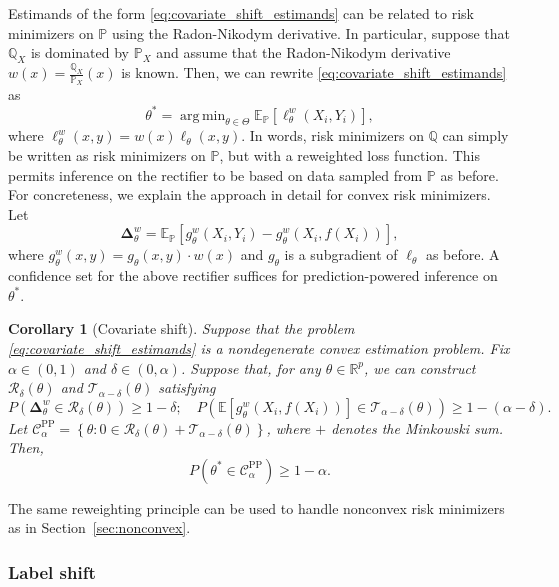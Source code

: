 \documentclass[10pt]{article}
\newtheorem{cor}{Corollary} %
\def\R{\mathbb{R}}
\def\E{\mathbb{E}}
\newcommand{\T}{\mathcal{T}}
\newcommand{\cR}{\mathcal{R}}
\renewcommand{\P}{\mathbb{P}}
\newcommand{\Q}{\mathbb{Q}}
\newcommand{\recw}{\mathbf{\Delta}^{w}}
\newcommand{\CPP}{\mathcal{C}^{\mathrm{PP}}}
\DeclareMathOperator*{\argmin}{arg\,min}
\begin{document}
Estimands of the form \eqref{eq:covariate_shift_estimands} can be related to risk minimizers on $\P$ using the Radon-Nikodym derivative. In particular, suppose that $\Q_X$ is dominated by $\P_X$ and assume that the Radon-Nikodym derivative $w(x) = \frac{\Q_X}{\P_X}(x)$ is known. Then, we can rewrite \eqref{eq:covariate_shift_estimands} as 
$$\theta^* = \argmin_{\theta\in \Theta} \E_{\P} [\ell_\theta^w(X_i,Y_i)],$$
where $\ell_\theta^w(x,y) = w(x) \ell_\theta(x,y)$. In words, risk minimizers on $\Q$ can simply be written as risk minimizers on $\P$, but with a reweighted loss function. This permits inference on the rectifier to be based on  data sampled from $\P$ as before. For concreteness, we explain the approach in detail for convex risk minimizers. Let
\begin{equation}
\label{eq:rec-covariate-shift}
\recw_{\theta} = \E_\P \left[g_\theta^w(X_i,Y_i) - g_\theta^w (X_i,f(X_i))\right],
\end{equation}
where $g_\theta^w (x,y) = g_\theta(x,y)\cdot w(x)$ and $g_\theta$ is a subgradient of $\ell_\theta$ as before. A confidence set for the above rectifier suffices for prediction-powered inference on $\theta^*$.



\begin{cor}[Covariate shift]
\label{cor:covariate-shift}
Suppose that the problem \eqref{eq:covariate_shift_estimands} is a nondegenerate convex estimation problem. Fix $\alpha\in(0,1)$ and $\delta\in(0,\alpha)$.
Suppose that, for any $\theta\in\R^p$, we can construct $\cR_\delta(\theta)$ and $\T_{\alpha-\delta}(\theta)$ satisfying
$$P\left(\recw_{\theta} \in \cR_{\delta}(\theta) \right) \geq 1-\delta; \quad P\left(\E [g^w_\theta(X_i,f(X_i))] \in \T_{\alpha-\delta}(\theta) \right) \geq 1-(\alpha-\delta).$$
Let $\CPP_\alpha = \left\{\theta : 0 \in \cR_\delta(\theta) + \T_{\alpha-\delta}(\theta)\right\}$, where $+$ denotes the Minkowski sum. Then,
\begin{equation}
    P( \theta^* \in \CPP_\alpha ) \geq 1-\alpha.
\end{equation}
\end{cor}

\noindent The same reweighting principle can be used to handle nonconvex risk minimizers as in Section~\ref{sec:nonconvex}.



\subsubsection{Label shift}
\end{document}
